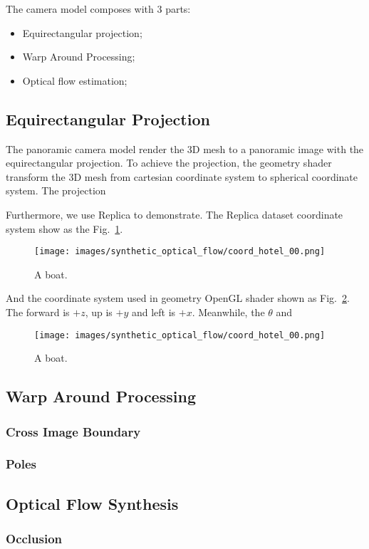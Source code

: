 The camera model composes with 3 parts:
\begin{itemize}
	\item Equirectangular projection;
	\item Warp Around Processing;
	\item Optical flow estimation;
\end{itemize}

\subsection{Equirectangular Projection}

The panoramic camera model render the 3D mesh to a panoramic image with the equirectangular projection.
To achieve the projection, the geometry shader transform the 3D mesh from cartesian coordinate system to spherical coordinate system.
The projection 

Furthermore, we use Replica to demonstrate. 
The Replica dataset coordinate system show as the Fig.~\ref{fig:approach:coord_hotel_00}.

\begin{figure}[hbt!]
	\centering
	\texttt{[image: images/synthetic\_optical\_flow/coord\_hotel\_00.png]}
	\caption{A boat.}
	\label{fig:approach:coord_hotel_00}
\end{figure}

And the coordinate system used in geometry OpenGL shader shown as Fig.~\ref{fig:approach:geometry_cs}.
The forward is $+z$, up is $+y$ and left is $+x$.
Meanwhile, the $\theta$ and 

\begin{figure}[hbt!]
	\centering
	\texttt{[image: images/synthetic\_optical\_flow/coord\_hotel\_00.png]}
	\caption{A boat.}
	\label{fig:approach:geometry_cs}
\end{figure}


\subsection{Warp Around Processing}




\subsubsection{Cross Image Boundary}


\subsubsection{Poles}


\subsection{Optical Flow Synthesis}



\subsubsection{Occlusion}


